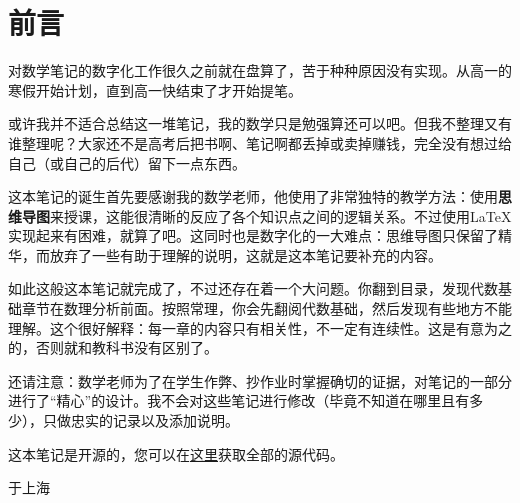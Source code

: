 \section*{前言}
对数学笔记的数字化工作很久之前就在盘算了，苦于种种原因没有实现。从高一的寒假开始计划，直到高一快结束了才开始提笔。

或许我并不适合总结这一堆笔记，我的数学只是勉强算还可以吧。但我不整理又有谁整理呢？大家还不是高考后把书啊、笔记啊都丢掉或卖掉赚钱，完全没有想过给自己（或自己的后代）留下一点东西。

这本笔记的诞生首先要感谢我的数学老师，他使用了非常独特的教学方法：使用\textbf{思维导图}来授课，这能很清晰的反应了各个知识点之间的逻辑关系。不过使用\LaTeX{}实现起来有困难，就算了吧。这同时也是数字化的一大难点：思维导图只保留了精华，而放弃了一些有助于理解的说明，这就是这本笔记要补充的内容。

如此这般这本笔记就完成了，不过还存在着一个大问题。你翻到目录，发现代数基础章节在数理分析前面。按照常理，你会先翻阅代数基础，然后发现有些地方不能理解。这个很好解释：每一章的内容只有相关性，不一定有连续性。这是有意为之的，否则就和教科书没有区别了。

还请注意：数学老师为了在学生作弊、抄作业时掌握确切的证据，对笔记的一部分进行了“精心”的设计。我不会对这些笔记进行修改（毕竟不知道在哪里且有多少），只做忠实的记录以及添加说明。

这本笔记是开源的，您可以在\href{https://github.com/jason-bowen-zheng/math-notes}{这里}获取全部的源代码。

\begin{flushright}
	\date{2022年6月}于上海
\end{flushright}
